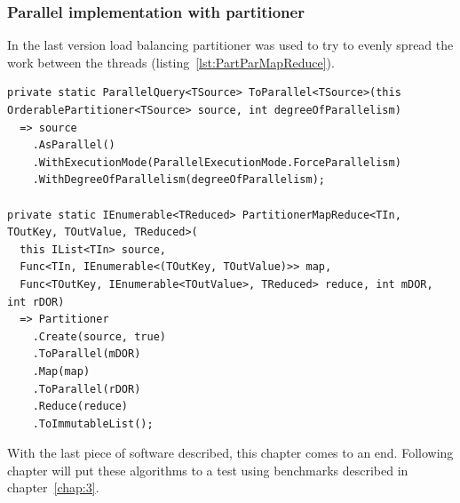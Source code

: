 \subsubsection{Parallel implementation with partitioner}
In the last version load balancing partitioner was used to try to evenly spread the work between the threads (listing~\ref{lst:PartParMapReduce}).

\begin{lstlisting}[language={[sharp]c}, style=sharpcstyle, caption={Parallel MapReduce implementation with partitioner}, label={lst:PartParMapReduce},
numbers=none, xleftmargin=0pt,framexleftmargin=0pt,framexrightmargin=0pt,framexbottommargin=0pt]
private static ParallelQuery<TSource> ToParallel<TSource>(this OrderablePartitioner<TSource> source, int degreeOfParallelism)
  => source
    .AsParallel()
    .WithExecutionMode(ParallelExecutionMode.ForceParallelism)
    .WithDegreeOfParallelism(degreeOfParallelism);

private static IEnumerable<TReduced> PartitionerMapReduce<TIn, TOutKey, TOutValue, TReduced>(
  this IList<TIn> source,
  Func<TIn, IEnumerable<(TOutKey, TOutValue)>> map,
  Func<TOutKey, IEnumerable<TOutValue>, TReduced> reduce, int mDOR, int rDOR)
  => Partitioner
    .Create(source, true)
    .ToParallel(mDOR)
    .Map(map)
    .ToParallel(rDOR)
    .Reduce(reduce)
    .ToImmutableList();
\end{lstlisting}

With the last piece of software described, this chapter comes to an end. Following chapter will put these algorithms to a test using benchmarks described in chapter~\ref{chap:3}.


